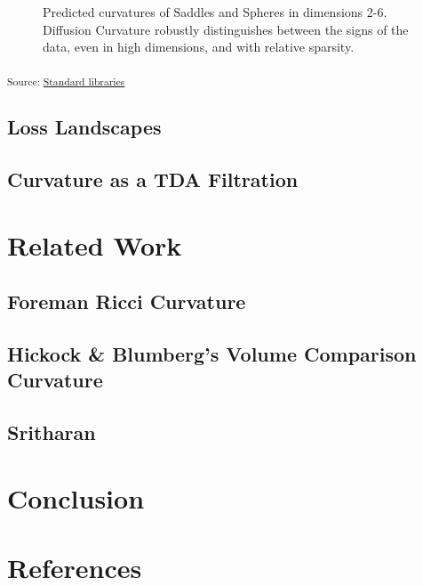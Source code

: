 \documentclass[
  letterpaper,
  DIV=11,
  numbers=noendperiod]{scrartcl}
\theoremstyle{plain}
\theoremstyle{definition}
\theoremstyle{plain}
\theoremstyle{definition}
\theoremstyle{plain}
\theoremstyle{remark}
\begin{document}
\begin{figure}[H]
{}

\caption{\label{fig-sadspheres}Predicted curvatures of Saddles and
Spheres in dimensions 2-6. Diffusion Curvature robustly distinguishes
between the signs of the data, even in high dimensions, and with
relative sparsity.}

\end{figure}%

\textsubscript{Source:
\href{https://professorwug.github.io/diffusion-curvature//Users/boreas/Pumberton/Workshop/21-SUMRY-Curvature/diffusion-curvature/nbs/5-sign-prediction-tests.ipynb.html\#cell-fig-sadspheres}{Standard
libraries}}

\subsection{Loss Landscapes}\label{loss-landscapes}

\subsection{Curvature as a TDA
Filtration}\label{curvature-as-a-tda-filtration}

\section{Related Work}\label{related-work}

\subsection{Foreman Ricci Curvature}\label{foreman-ricci-curvature}

\subsection{Hickock \& Blumberg's Volume Comparison
Curvature}\label{hickock-blumbergs-volume-comparison-curvature}

\subsection{Sritharan}\label{sritharan}

\section{Conclusion}\label{conclusion}

\section*{References}\label{references}
\end{document}
